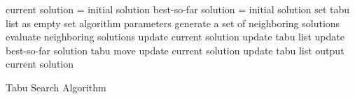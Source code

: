 \begin{algorithm2e}
	current solution = initial solution\;
	best-so-far solution = initial solution\;
	set tabu list as empty\;
	set algorithm parameters\;
	{
		generate a set of neighboring solutions\;
		evaluate neighboring solutions\;
		{
			update current solution\;
			update tabu list\;
			update best-so-far solution\;
		}
		{
			tabu move\;
			update current solution\;
			update tabu list\;
		}
	}
	output current solution\;
	\caption{Tabu Search Algorithm}
	\label{algo:tabu_search}
\end{algorithm2e}
